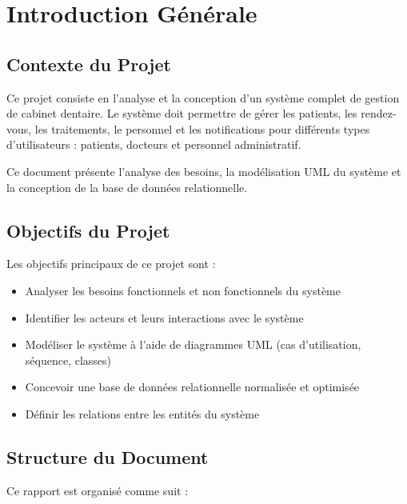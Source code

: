 \documentclass[12pt,a4paper]{report}
\begin{document}
\chapter{Introduction Générale}
\section{Contexte du Projet}

Ce projet consiste en l'analyse et la conception d'un système complet de gestion de cabinet dentaire. Le système doit permettre de gérer les patients, les rendez-vous, les traitements, le personnel et les notifications pour différents types d'utilisateurs : patients, docteurs et personnel administratif.

Ce document présente l'analyse des besoins, la modélisation UML du système et la conception de la base de données relationnelle.

\section{Objectifs du Projet}

Les objectifs principaux de ce projet sont :

\begin{itemize}
    \item Analyser les besoins fonctionnels et non fonctionnels du système
    \item Identifier les acteurs et leurs interactions avec le système
    \item Modéliser le système à l'aide de diagrammes UML (cas d'utilisation, séquence, classes)
    \item Concevoir une base de données relationnelle normalisée et optimisée
    \item Définir les relations entre les entités du système
\end{itemize}

\section{Structure du Document}

Ce rapport est organisé comme suit :
\end{document}
